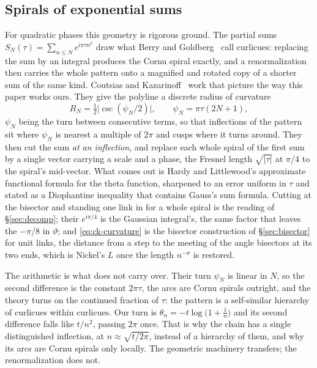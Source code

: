 \documentclass[11pt]{article}
\theoremstyle{definition}
\begin{document}
\subsection{Spirals of exponential sums}\label{sec:curlicues}

For quadratic phases this geometry is rigorous ground. The partial sums
$S_N(\tau)=\sum_{n\le N}e^{i\pi\tau n^{2}}$ draw what Berry and
Goldberg~\cite{BerryGoldberg1988} call curlicues: replacing the sum by an
integral produces the Cornu spiral exactly, and a renormalization then carries
the whole pattern onto a magnified and rotated copy of a shorter sum of the same
kind. Coutsias and Kazarinoff~\cite{CoutsiasKazarinoff1987,CoutsiasKazarinoff1998}
work that picture the way this paper works ours. They give the polyline a
discrete radius of curvature
\begin{equation}\label{eq:ck-curvature}
R_N=\tfrac12\bigl|\csc(\psi_N/2)\bigr|,
\qquad \psi_N=\pi\tau(2N+1),
\end{equation}
$\psi_N$ being the turn between consecutive terms, so that inflections of the
pattern sit where $\psi_N$ is nearest a multiple of $2\pi$ and cusps where it
turns around. They then cut the sum \emph{at an inflection}, and replace each
whole spiral of the first sum by a single vector carrying a scale and a phase,
the Fresnel length $\sqrt{|\tau|}$ at $\pi/4$ to the spiral's mid-vector. What
comes out is Hardy and Littlewood's approximate functional formula for the theta
function, sharpened to an error uniform in $\tau$ and stated as a Diophantine
inequality that contains Gauss's sum formula. Cutting at the bisector and standing
one link in for a whole spiral is the reading of \S\ref{sec:decomp}; their
$e^{i\pi/4}$ is the Gaussian integral's, the same factor that leaves the
$-\pi/8$ in $\vartheta$; and \eqref{eq:ck-curvature} is the bisector construction of
\S\ref{sec:bisector} for unit links, the distance from a step to the meeting of
the angle bisectors at its two ends, which is Nickel's $L$ once the length
$n^{-\sigma}$ is restored.

The arithmetic is what does not carry over. Their turn $\psi_N$ is linear in
$N$, so the second difference is the constant $2\pi\tau$, the arcs are Cornu
spirals outright, and the theory turns on the continued fraction of $\tau$:
the pattern is a self-similar hierarchy of curlicues within curlicues. Our turn
is $\theta_n=-t\log\bigl(1+\tfrac1n\bigr)$ and its second difference falls like
$t/n^{2}$, passing $2\pi$ once. That is why the chain has a single distinguished
inflection, at $n\approx\sqrt{t/2\pi}$, instead of a hierarchy of them, and why its
arcs are Cornu spirals only locally. The geometric machinery transfers; the
renormalization does not.
\end{document}
